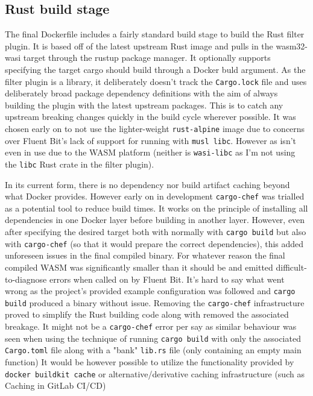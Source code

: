 \subsection{Rust build stage}
The final Dockerfile includes a fairly standard build stage to build the Rust filter plugin. It is based off of the latest upstream Rust image and pulls in the wasm32-wasi target through the rustup package manager. It optionally supports specifying the target cargo should build through a Docker buld argument. As the filter plugin is a library, it deliberately doesn't track the \texttt{Cargo.lock} file and uses deliberately broad package dependency definitions with the aim of always building the plugin with the latest upstream packages. This is to catch any upstream breaking changes quickly in the build cycle wherever possible. It was chosen early on to not use the lighter-weight \texttt{rust-alpine} image due to concerns over Fluent Bit's lack of support for running with \texttt{musl libc}. However as  isn't even in use due to the WASM platform (neither is \texttt{wasi-libc} as I'm not using the \texttt{libc} Rust crate in the filter plugin).

In its current form, there is no dependency nor build artifact caching beyond what Docker provides. However early on in development \texttt{cargo-chef} was trialled as a potential tool to reduce build times. It works on the principle of installing all dependencies in one Docker layer before building in another layer. However, even after specifying the desired target both with normally with \texttt{cargo build} but also with \texttt{cargo-chef} (so that it would prepare the correct dependencies), this added unforeseen issues in the final compiled binary. For whatever reason the final compiled WASM was significantly smaller than it should be and emitted difficult-to-diagnose errors when called on by Fluent Bit. It's hard to say what went wrong as the project's provided example configuration was followed and \texttt{cargo build} produced a binary without issue. Removing the \texttt{cargo-chef} infrastructure proved to simplify the Rust building code along with removed the associated breakage. It might not be a \texttt{cargo-chef} error per say as similar behaviour was seen when using the technique of running \texttt{cargo build} with only the associated \texttt{Cargo.toml} file along with a "bank" \texttt{lib.rs} file (only containing an empty main function)
It would be however possible to utilize the functionality provided by \texttt{docker buildkit cache} or alternative/derivative caching infrastructure (such as Caching in GitLab CI/CD)

